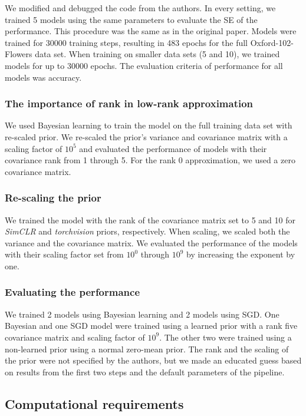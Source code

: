We modified and debugged the code from the authors. In every setting, we trained 5 models using the same parameters to evaluate the SE of the performance. This procedure was the same as in the original paper.
Models were trained for 30000 training steps, resulting in 483 epochs for the full Oxford-102-Flowers data set. When training on smaller data sets (5 and 10), we trained models for up to 30000 epochs. The evaluation criteria of performance for all models was accuracy.

\subsubsection{The importance of rank in low-rank approximation}
We used Bayesian learning to train the model on the full training data set with re-scaled prior. We re-scaled the prior's variance and covariance matrix with a scaling factor of $10^5$ and evaluated the performance of models with their covariance rank from 1 through 5. For the rank 0 approximation, we used a zero covariance matrix.

\subsubsection{Re-scaling the prior}
We trained the model with the rank of the covariance matrix set to 5 and 10 for \textit{SimCLR} and \textit{torchvision} priors, respectively. When scaling, we scaled both the variance and the covariance matrix. We evaluated the performance of the models with their scaling factor set from $10^0$ through $10^9$ by increasing the exponent by one.

\subsubsection{Evaluating the performance}
We trained 2 models using Bayesian learning and 2 models using SGD.
One Bayesian and one SGD model were trained using a learned prior with a rank five covariance matrix and scaling factor of $10^9$. The other two were trained using a non-learned prior using a normal zero-mean prior. The rank and the scaling of the prior were not specified by the authors, but we made an educated guess based on results from the first two steps and the default parameters of the pipeline.


\subsection{Computational requirements}

